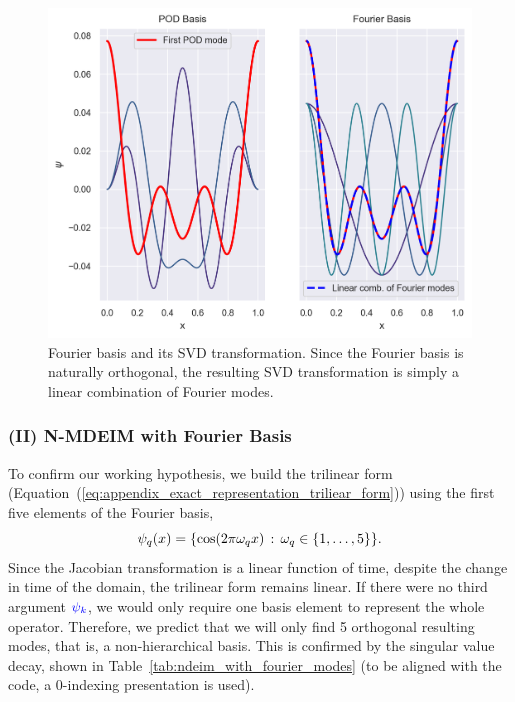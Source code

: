 \documentclass[../../thesis.tex]{subfiles}
\begin{document}
\begin{figure}[h]
    \includegraphics[width=\columnwidth]{research_project/piston/figures/svd_fourier/fourier_pod_bases.png}
    \caption{Fourier basis and its SVD transformation. 
    Since the Fourier basis is naturally orthogonal, 
    the resulting SVD transformation is simply a linear combination of Fourier modes.}
\end{figure}

\subsubsection{(II) N-MDEIM with Fourier Basis}
To confirm our working hypothesis, 
we build the trilinear form 
(Equation~(\ref{eq:appendix_exact_representation_triliear_form}))
using the first five elements of the Fourier basis,
\begin{equation}
    \psi_q(x) = \qty{\cos(2 \pi \omega_q x) \, : \, \omega_q \in \qty{1, \ldots, 5}}.
\end{equation}
Since the Jacobian transformation is a linear function of time, 
despite the change in time of the domain, the trilinear form remains linear.
If there were no third argument 
$\textcolor{blue}{\psi_k}$, 
we would only require one basis element to represent the whole operator.
Therefore, we predict that we will only find 5 orthogonal resulting modes, that is, a non-hierarchical basis. 
This is confirmed by the singular value decay, 
shown in Table~\ref{tab:ndeim_with_fourier_modes}
(to be aligned with the code, a 0-indexing presentation is used).
\end{document}

